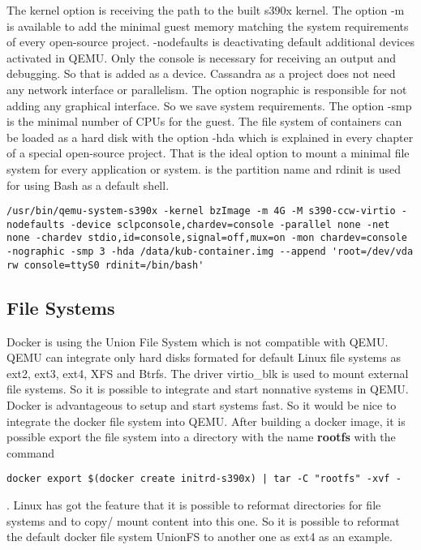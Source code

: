 The kernel option is receiving the path to the built s390x kernel. The option -m is available to add the minimal guest memory matching the system requirements of every open-source project. -nodefaults is deactivating default additional devices activated in QEMU. Only the console is necessary for receiving an output and debugging. So that is added as a device. Cassandra as a project does not need any network interface or parallelism. The option nographic is responsible for not adding any graphical interface. So we save system requirements. The option -smp is the minimal number of CPUs for the guest. The file system of containers can be loaded as a hard disk with the option -hda which is explained in every chapter of a special open-source project. That is the ideal option to mount a minimal file system for every application or system.  is the partition name and rdinit is used for using Bash as a default shell. \\


\begin{lstlisting}[style=BashInputStyle]
/usr/bin/qemu-system-s390x -kernel bzImage -m 4G -M s390-ccw-virtio -nodefaults -device sclpconsole,chardev=console -parallel none -net none -chardev stdio,id=console,signal=off,mux=on -mon chardev=console -nographic -smp 3 -hda /data/kub-container.img --append 'root=/dev/vda rw console=ttyS0 rdinit=/bin/bash'
\end{lstlisting}

\subsection{File Systems}

Docker is using the Union File System which is not compatible with QEMU.
QEMU can integrate only hard disks formated for default Linux file systems as ext2, ext3, ext4, XFS and Btrfs. 
The driver virtio\_blk is used to mount external file systems. So it is possible to integrate and start nonnative systems in QEMU. 
Docker is advantageous to setup and start systems fast. 
So it would be nice to integrate the docker file system into QEMU. After building a docker image, it is possible export the file system into a directory with the name \textbf{rootfs} with the command 
\begin{lstlisting}[style=BashInputStyle]
docker export $(docker create initrd-s390x) | tar -C "rootfs" -xvf -
\end{lstlisting}
.
Linux has got the feature that it is possible to reformat directories for file systems and to copy/ mount content into this one. So it is possible to reformat the default docker file system UnionFS to another one as ext4 as an example. 

